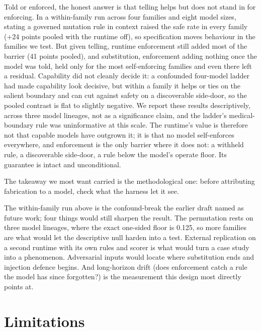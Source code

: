 \documentclass[11pt]{article}
\begin{document}
Told or enforced, the honest answer is that telling helps but does not stand in for enforcing. In a within-family run across four families and eight model sizes, stating a governed mutation rule in context raised the safe rate in every family (+24 points pooled with the runtime off), so specification moves behaviour in the families we test. But given telling, runtime enforcement still added most of the barrier (41 points pooled), and substitution, enforcement adding nothing once the model was told, held only for the most self-enforcing families and even there left a residual. Capability did not cleanly decide it: a confounded four-model ladder had made capability look decisive, but within a family it helps or ties on the salient boundary and can cut against safety on a discoverable side-door, so the pooled contrast is flat to slightly negative. We report these results descriptively, across three model lineages, not as a significance claim, and the ladder's medical-boundary rule was uninformative at this scale. The runtime's value is therefore not that capable models have outgrown it; it is that no model self-enforces everywhere, and enforcement is the only barrier where it does not: a withheld rule, a discoverable side-door, a rule below the model's operate floor. Its guarantee is intact and unconditional.

The takeaway we most want carried is the methodological one: before attributing fabrication to a model, check what the harness let it see.

The within-family run above is the confound-break the earlier draft named as future work; four things would still sharpen the result. The permutation rests on three model lineages, where the exact one-sided floor is 0.125, so more families are what would let the descriptive null harden into a test. External replication on a second runtime with its own rules and scorer is what would turn a case study into a phenomenon. Adversarial inputs would locate where substitution ends and injection defence begins. And long-horizon drift (does enforcement catch a rule the model has since forgotten?) is the measurement this design most directly points at.

\section*{Limitations}\label{limitations}
\end{document}
